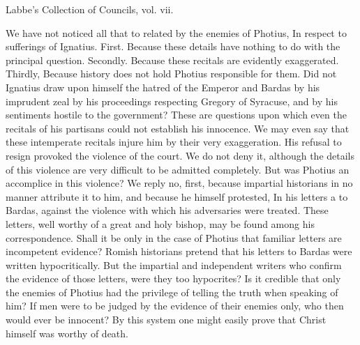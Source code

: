 Labbe’s Collection of Councils, vol. vii.

We have not noticed all that to related by the enemies of Photius, In respect to sufferings of Ignatius. First. Because these details have nothing to do with the principal question. Secondly. Because these recitals are evidently exaggerated. Thirdly, Because history does not hold Photius responsible for them. Did not Ignatius draw upon himself the hatred of the Emperor and Bardas by his imprudent zeal by his proceedings respecting Gregory of Syracuse, and by his sentiments hostile to the government? These are questions upon which even the recitals of his partisans could not establish his innocence. We may even say that these intemperate recitals injure him by their very exaggeration. His refusal to resign provoked the violence of the court. We do not deny it, although the details of this violence are very difficult to be admitted completely. But was Photius an accomplice in this violence? We reply no, first, because impartial historians in no manner attribute it to him, and because he himself protested, In his letters a to Bardas, against the violence with which his adversaries were treated. These letters, well worthy of a great and holy bishop, may be found among his correspondence. Shall it be only in the case of Photius that familiar letters are incompetent evidence? Romish historians pretend that his letters to Bardas were written hypocritically. But the impartial and independent writers who confirm the evidence of those letters, were they too hypocrites? Is it credible that only the enemies of Photius had the privilege of telling the truth when speaking of him? If men were to be judged by the evidence of their enemies only, who then would ever be innocent? By this system one might easily prove that Christ himself was worthy of death.

